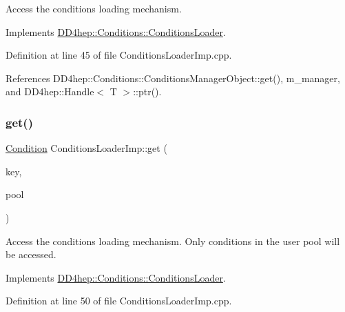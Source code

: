Access the conditions loading mechanism. 



Implements \hyperlink{class_d_d4hep_1_1_conditions_1_1_conditions_loader_a9705bbf09205a5f20a979ae3fe1005bb}{D\+D4hep\+::\+Conditions\+::\+Conditions\+Loader}.



Definition at line 45 of file Conditions\+Loader\+Imp.\+cpp.



References D\+D4hep\+::\+Conditions\+::\+Conditions\+Manager\+Object\+::get(), m\+\_\+manager, and D\+D4hep\+::\+Handle$<$ T $>$\+::ptr().

\hypertarget{class_d_d4hep_1_1_conditions_1_1_conditions_loader_imp_a742f7d5a8d3d0666ee64baa3502982ce}{}\label{class_d_d4hep_1_1_conditions_1_1_conditions_loader_imp_a742f7d5a8d3d0666ee64baa3502982ce} 
\subsubsection{\texorpdfstring{get()}{get()}\hspace{0.1cm}{\footnotesize\ttfamily [2/2]}}
{\footnotesize\ttfamily \hyperlink{class_d_d4hep_1_1_conditions_1_1_condition}{Condition} Conditions\+Loader\+Imp\+::get (\begin{DoxyParamCaption}\item[{\hyperlink{class_d_d4hep_1_1_conditions_1_1_conditions_loader_ac77fe60ee60373d61aed19b200949c93}{key\+\_\+type}}]{key,  }\item[{const \hyperlink{class_d_d4hep_1_1_conditions_1_1_user_pool}{User\+Pool} \&}]{pool }\end{DoxyParamCaption})\hspace{0.3cm}{\ttfamily [virtual]}}



Access the conditions loading mechanism. Only conditions in the user pool will be accessed. 



Implements \hyperlink{class_d_d4hep_1_1_conditions_1_1_conditions_loader_a9d8cacc0e3520074b386d157906a376f}{D\+D4hep\+::\+Conditions\+::\+Conditions\+Loader}.



Definition at line 50 of file Conditions\+Loader\+Imp.\+cpp.



